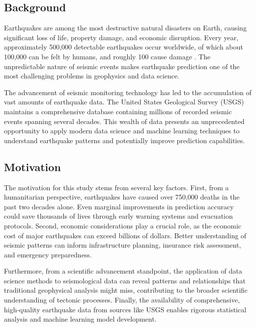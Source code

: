 
\subsection{Background}

Earthquakes are among the most destructive natural disasters on Earth, causing significant loss of life, property damage, and economic disruption. Every year, approximately 500,000 detectable earthquakes occur worldwide, of which about 100,000 can be felt by humans, and roughly 100 cause damage \cite{usgs2024}. The unpredictable nature of seismic events makes earthquake prediction one of the most challenging problems in geophysics and data science.

The advancement of seismic monitoring technology has led to the accumulation of vast amounts of earthquake data. The United States Geological Survey (USGS) maintains a comprehensive database containing millions of recorded seismic events spanning several decades. This wealth of data presents an unprecedented opportunity to apply modern data science and machine learning techniques to understand earthquake patterns and potentially improve prediction capabilities.

\subsection{Motivation}

The motivation for this study stems from several key factors. First, from a humanitarian perspective, earthquakes have caused over 750,000 deaths in the past two decades alone. Even marginal improvements in prediction accuracy could save thousands of lives through early warning systems and evacuation protocols. Second, economic considerations play a crucial role, as the economic cost of major earthquakes can exceed billions of dollars. Better understanding of seismic patterns can inform infrastructure planning, insurance risk assessment, and emergency preparedness.

Furthermore, from a scientific advancement standpoint, the application of data science methods to seismological data can reveal patterns and relationships that traditional geophysical analysis might miss, contributing to the broader scientific understanding of tectonic processes. Finally, the availability of comprehensive, high-quality earthquake data from sources like USGS enables rigorous statistical analysis and machine learning model development.

